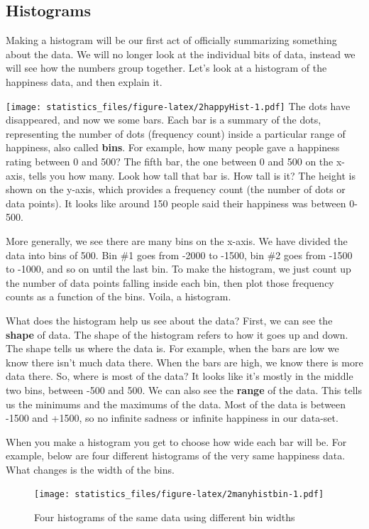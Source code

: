 \documentclass[]{book}
\begin{document}
\hypertarget{histograms}{%
\subsection{Histograms}\label{histograms}}

Making a histogram will be our first act of officially summarizing something about the data. We will no longer look at the individual bits of data, instead we will see how the numbers group together. Let's look at a histogram of the happiness data, and then explain it.

\texttt{[image: statistics\_files/figure-latex/2happyHist-1.pdf]}
The dots have disappeared, and now we some bars. Each bar is a summary of the dots, representing the number of dots (frequency count) inside a particular range of happiness, also called \textbf{bins}. For example, how many people gave a happiness rating between 0 and 500? The fifth bar, the one between 0 and 500 on the x-axis, tells you how many. Look how tall that bar is. How tall is it? The height is shown on the y-axis, which provides a frequency count (the number of dots or data points). It looks like around 150 people said their happiness was between 0-500.

More generally, we see there are many bins on the x-axis. We have divided the data into bins of 500. Bin \#1 goes from -2000 to -1500, bin \#2 goes from -1500 to -1000, and so on until the last bin. To make the histogram, we just count up the number of data points falling inside each bin, then plot those frequency counts as a function of the bins. Voila, a histogram.

What does the histogram help us see about the data? First, we can see the \textbf{shape} of data. The shape of the histogram refers to how it goes up and down. The shape tells us where the data is. For example, when the bars are low we know there isn't much data there. When the bars are high, we know there is more data there. So, where is most of the data? It looks like it's mostly in the middle two bins, between -500 and 500. We can also see the \textbf{range} of the data. This tells us the minimums and the maximums of the data. Most of the data is between -1500 and +1500, so no infinite sadness or infinite happiness in our data-set.

When you make a histogram you get to choose how wide each bar will be. For example, below are four different histograms of the very same happiness data. What changes is the width of the bins.

\begin{figure}
\centering
\texttt{[image: statistics\_files/figure-latex/2manyhistbin-1.pdf]}
\caption{\label{fig:2manyhistbin}Four histograms of the same data using different bin widths}
\end{figure}
\end{document}
